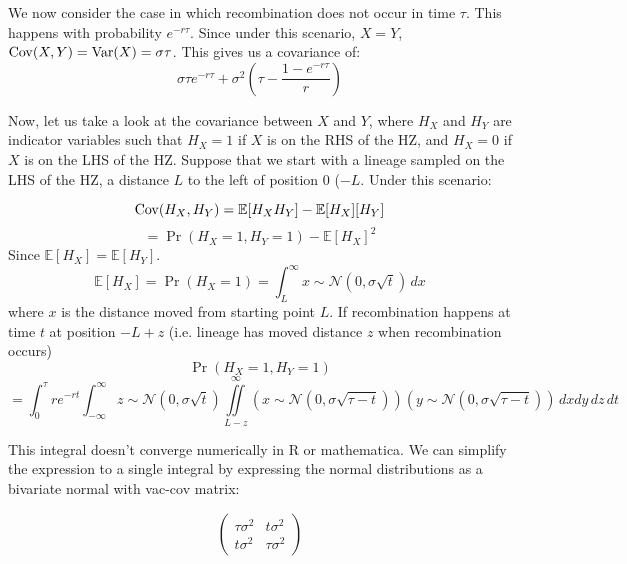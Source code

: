 \documentclass[12pt]{article}
\newcommand{\gc}[1]{{\em \color{blue} {Graham: #1} }}
\def\Var{\mathop{\rm Var}}
\def\Cov{\mathop{\rm Cov}}
\begin{document}
We now consider the case in which recombination does not occur in time $\tau$. This happens with probability $e^{-r\tau}$. Since under this scenario, $X=Y$, $\Cov(X,Y) = \Var(X) = \sigma\tau$. This gives us a covariance of:
$$\sigma\tau e^{-r\tau} + \sigma^2(\tau - \frac{1-e^{-r\tau}}{r})$$

Now, let us take a look at the covariance between $X$ and $Y$, where $H_X$ and $H_Y$ are indicator variables such that  $H_X = 1$ if $X$ is on the RHS of the HZ, and $H_X = 0$ if $X$ is on the LHS of the HZ. Suppose that we start with a lineage sampled on the LHS of the HZ, a distance $L$ to the left of position 0 ($-L$. Under this scenario:

$$\Cov(H_X,H_Y) = 	\mathbb{E}[H_XH_Y] - \mathbb{E}[H_X][H_Y]$$
$$= \Pr(H_X = 1, H_Y=1) - \mathbb{E}[H_X]^2$$
Since $\mathbb{E}[H_X] = \mathbb{E}[H_Y]$.
$$\mathbb{E}[H_X] = \Pr(H_X = 1) = \int_L^\infty \! x\sim\mathcal{N}(0,\sigma\sqrt{t}) \,dx$$
where $x$ is the distance moved from starting point $L$. If recombination happens at time $t$ at position $-L+z$ (i.e. lineage has moved distance $z$ when recombination occurs)
$$\Pr(H_X = 1, H_Y=1) $$
$$= \int_0^\tau  re^{-rt}\int_{-\infty}^\infty z\sim\mathcal{N}(0,\sigma\sqrt{t})  \iint \limits_{L-z}^\infty   (x\sim\mathcal{N}(0,\sigma\sqrt{\tau - t}))  (y\sim\mathcal{N}(0,\sigma\sqrt{\tau - t}))                             \,dxdy  \, dz \, dt$$




This integral doesn't converge numerically in R or mathematica. We can simplify the expression to a single integral by expressing the normal distributions as a bivariate normal with vac-cov matrix:

\[\left (\begin{array}{cc}
\tau\sigma^2 & t\sigma^2\\
t\sigma^2 & \tau\sigma^2\end{array}\right)\]
\end{document}
